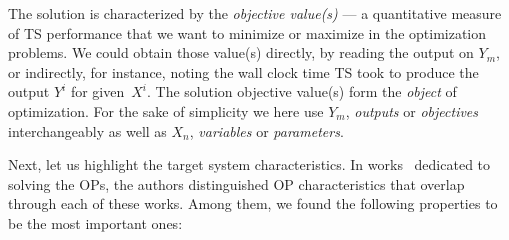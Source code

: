 The solution is characterized by the \emph{objective value(s)} — a quantitative measure of TS performance that we want to minimize or maximize in the optimization problems. We could obtain those value(s) directly, by reading the output on $Y_m$, or indirectly, for instance, noting the wall clock time TS took to produce the output $Y^i$ for given~$X^i$. The solution objective value(s) form the \emph{object} of optimization. 
For the sake of simplicity we here use $Y_m$, \textit{outputs} or \textit{objectives} interchangeably as well as $X_n$, \textit{variables} or \textit{parameters}.

Next, let us highlight the target system characteristics. In works~\cite{biegler2004retrospective,figueira2014hybrid,deb2014multi,amaran2016simulation} dedicated to solving the OPs, the authors distinguished OP characteristics that overlap through each of these works. Among them, we found the following properties to be the most important ones:
